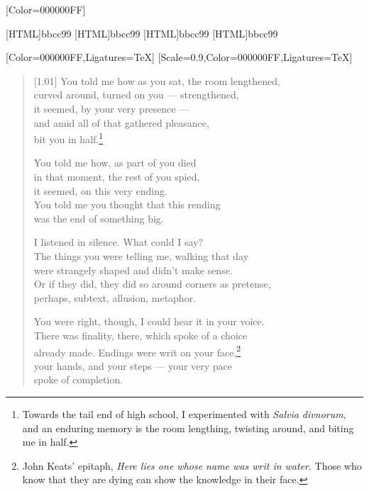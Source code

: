 \renewfontfamily{}[Color=000000FF]

[HTML]{bbcc99}
[HTML]{bbcc99}
[HTML]{bbcc99}
[HTML]{bbcc99}
\begin{paracol}{2}
  \begin{leftcolumn}
[Color=000000FF,Ligatures=TeX]
\renewfontfamily{}[Scale=0.9,Color=000000FF,Ligatures=TeX]

\begin{verse}[1.01\textwidth]
You told me how as you sat, the room lengthened,\\
curved around, turned on you --- strengthened,\\
it seemed, by your very presence ---\\
and amid all of that gathered pleasance,\\
bit you in half.\footnote{Towards the tail end of high school, I experimented with \emph{Salvia divnorum}, and an enduring memory is the room lengthing, twisting around, and biting me in half.}

You told me how, as part of you died\\
in that moment, the rest of you spied,\\
it seemed, on this very ending.\\
You told me you thought that this rending\\
was the end of something big.

I listened in silence. What could I say?\\
The things you were telling me, walking that day\\
were strangely shaped and didn't make sense.\\
Or if they did, they did so around corners as pretense,\\
perhaps, subtext, allusion, metaphor.

You were right, though, I could hear it in your voice.\\
There was finality, there, which spoke of a choice\\
already made. Endings were writ on your face,\footnote{John Keats' epitaph, \emph{Here lies one whose name was writ in water}. Those who know that they are dying can show the knowledge in their face.}\\
your hands, and your steps --- your very pace\\
spoke of completion.
\end{verse}
\newpage
\end{leftcolumn}
\end{paracol}


